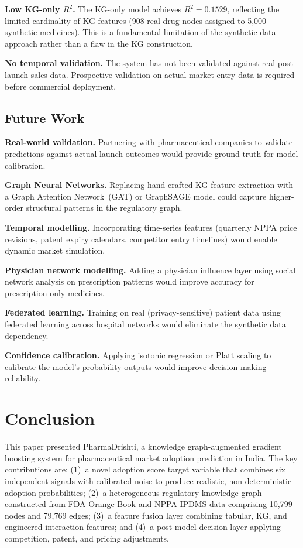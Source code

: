 \documentclass[10pt,journal,compsoc]{IEEEtran}
\begin{document}
\textbf{Low KG-only $R^2$.}
The KG-only model achieves $R^2=0.1529$, reflecting the limited cardinality of KG
features (908 real drug nodes assigned to 5{,}000 synthetic medicines).
This is a fundamental limitation of the synthetic data approach rather than a flaw in
the KG construction.

\textbf{No temporal validation.}
The system has not been validated against real post-launch sales data.
Prospective validation on actual market entry data is required before commercial
deployment.

\subsection{Future Work}

\textbf{Real-world validation.}
Partnering with pharmaceutical companies to validate predictions against actual launch
outcomes would provide ground truth for model calibration.

\textbf{Graph Neural Networks.}
Replacing hand-crafted KG feature extraction with a Graph Attention Network~(GAT) or
GraphSAGE model could capture higher-order structural patterns in the regulatory graph.

\textbf{Temporal modelling.}
Incorporating time-series features (quarterly NPPA price revisions, patent expiry
calendars, competitor entry timelines) would enable dynamic market simulation.

\textbf{Physician network modelling.}
Adding a physician influence layer using social network analysis on prescription
patterns would improve accuracy for prescription-only medicines.

\textbf{Federated learning.}
Training on real (privacy-sensitive) patient data using federated learning across
hospital networks would eliminate the synthetic data dependency.

\textbf{Confidence calibration.}
Applying isotonic regression or Platt scaling to calibrate the model's probability
outputs would improve decision-making reliability.

\section{Conclusion}
\label{sec:conclusion}

This paper presented PharmaDrishti, a knowledge graph-augmented gradient boosting
system for pharmaceutical market adoption prediction in India.
The key contributions are:
(1)~a novel adoption score target variable that combines six independent signals with
calibrated noise to produce realistic, non-deterministic adoption probabilities;
(2)~a heterogeneous regulatory knowledge graph constructed from FDA Orange Book and
NPPA IPDMS data comprising 10{,}799 nodes and 79{,}769 edges;
(3)~a feature fusion layer combining tabular, KG, and engineered interaction features;
and
(4)~a post-model decision layer applying competition, patent, and pricing adjustments.
\end{document}
